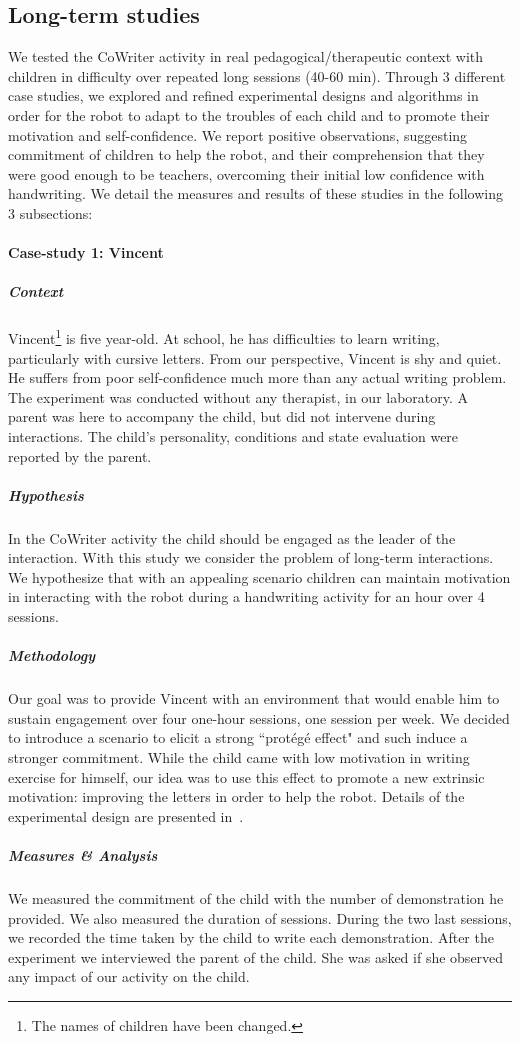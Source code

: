 \documentclass[10pt,a4paper]{article}
\begin{document}
\subsection{Long-term studies}\label{long}
We tested the CoWriter activity in real pedagogical/therapeutic context with
children in difficulty over repeated long sessions (40-60 min). Through 3 different
case studies, we explored and refined experimental designs and algorithms in
order for the robot to adapt to the
troubles of each child and to promote their motivation and self-confidence. We report positive observations, suggesting commitment of children to help the
robot, and their comprehension that they were good enough to be teachers,
overcoming their initial low confidence with handwriting. We detail the measures and results of these studies in the following 3 subsections:
\paragraph{Case-study 1: Vincent}
\subparagraph{Context}
Vincent\footnote{The names of children have been changed.} is five year-old. At school, he has difficulties to learn writing, particularly with cursive letters. From our perspective, Vincent is shy and quiet. He suffers from poor self-confidence much more than any actual writing problem. The experiment was conducted without any therapist, in our laboratory. A parent was here to accompany the child, but did not intervene during interactions. The child's personality, conditions and state evaluation were reported by the parent.
\subparagraph{Hypothesis}
In the CoWriter activity the child should be engaged as the leader of the interaction. 
With this study we consider the problem of long-term interactions. We hypothesize that with an appealing scenario children can maintain motivation in interacting with the robot during a handwriting activity for an hour over 4 sessions.
\subparagraph{Methodology}
Our goal was to provide Vincent with
an environment that would enable him to sustain engagement over four one-hour sessions, 
one session per week. We decided to introduce a scenario to elicit a strong ``prot\'eg\'e effect" and such induce a stronger commitment. While the child came with low motivation in writing exercise for himself, our idea was to use this effect to promote a new extrinsic motivation: improving the letters in order to help the robot. Details of the experimental design are presented in~\cite{jacq2016building}.
\subparagraph{Measures \& Analysis}
We measured the commitment of the child with the number of demonstration he provided. We also measured the duration of sessions. During the two last sessions, we recorded the time taken by the child to write each demonstration. After the experiment we interviewed the parent of the child. She was asked if she observed any impact of our activity on the child.
\end{document}
